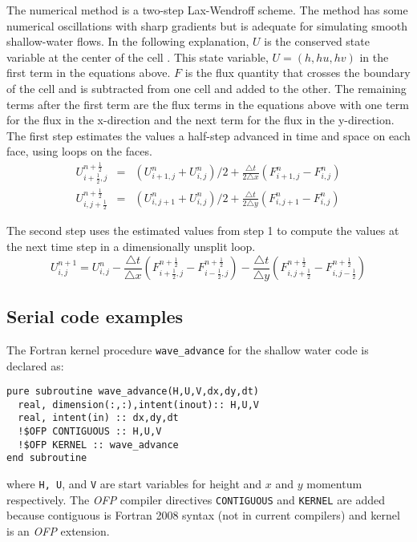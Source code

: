 The numerical method is a two-step Lax-Wendroff scheme. The method
has some numerical oscillations with sharp gradients but is adequate
for simulating smooth shallow-water flows. In the following explanation,
$U$ is the conserved state variable at the center of the cell . This
state variable, $U=(h,hu,hv)$ in the first term in the equations
above. $F$ is the flux quantity that crosses the boundary of the cell
and is subtracted from one cell and added to the other. The remaining
terms after the first term are the flux terms in the equations above
with one term for the flux in the x-direction and the next term for
the flux in the y-direction. The first step estimates the values a
half-step advanced in time and space on each face, using loops on
the faces.\begin{eqnarray*}
U_{i+\frac{1}{2},j}^{n+\frac{1}{2}} & = & (U_{i+1,j}^{n}+U_{i,j}^{n})/2+\frac{\triangle t}{2\triangle x}\left(F_{i+1,j}^{n}-F_{i,j}^{n}\right)\\
U_{i,j+\frac{1}{2}}^{n+\frac{1}{2}} & = & (U_{i,j+1}^{n}+U_{i,j}^{n})/2+\frac{\triangle t}{2\triangle y}\left(F_{i,j+1}^{n}-F_{i,j}^{n}\right)\end{eqnarray*}


The second step uses the estimated values from step 1 to compute the
values at the next time step in a dimensionally unsplit loop.\[
U_{i,j}^{n+1}=U_{i,j}^{n}-\frac{\triangle t}{\triangle x}(F_{i+\frac{1}{2},j}^{n+\frac{1}{2}}-F_{i-\frac{1}{2},j}^{n+\frac{1}{2}})-\frac{\triangle t}{\triangle y}(F_{i,j+\frac{1}{2}}^{n+\frac{1}{2}}-F_{i,j-\frac{1}{2}}^{n+\frac{1}{2}})\]


\subsection{Serial code examples}

The Fortran kernel procedure {\tt wave\_advance} for the shallow water code
is declared as:

{\small
\begin{verbatim}
pure subroutine wave_advance(H,U,V,dx,dy,dt)
  real, dimension(:,:),intent(inout):: H,U,V
  real, intent(in) :: dx,dy,dt
  !$OFP CONTIGUOUS :: H,U,V
  !$OFP KERNEL :: wave_advance
end subroutine
\end{verbatim}
}

where {\tt H, U}, and {\tt V} are start variables for height and
$x$ and $y$ momentum respectively.  The \emph{OFP} compiler directives
{\tt CONTIGUOUS} and {\tt KERNEL} are added because contiguous is Fortran
2008 syntax (not in current compilers) and kernel is an \emph{OFP} extension.

